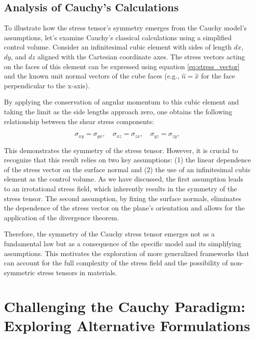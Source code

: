 \documentclass[12pt,a4paper,english]{article}
\begin{document}
\subsection{Analysis of Cauchy's Calculations}

To illustrate how the stress tensor's symmetry emerges from the Cauchy model's assumptions, let's examine Cauchy's classical calculations using a simplified control volume. Consider an infinitesimal cubic element with sides of length $dx$, $dy$, and $dz$ aligned with the Cartesian coordinate axes. The stress vectors acting on the faces of this element can be expressed using equation \ref{eq:stress_vector} and the known unit normal vectors of the cube faces (e.g., $\hat{n} = \hat{x}$ for the face perpendicular to the x-axis).

By applying the conservation of angular momentum to this cubic element and taking the limit as the side lengths approach zero, one obtains the following relationship between the shear stress components:

\begin{equation}
\sigma_{xy} = \sigma_{yx}, \quad \sigma_{xz} = \sigma_{zx}, \quad \sigma_{yz} = \sigma_{zy},
\end{equation}


This demonstrates the symmetry of the stress tensor. However, it is crucial to recognize that this result relies on two key assumptions: (1) the linear dependence of the stress vector on the surface normal and (2) the use of an infinitesimal cubic element as the control volume. As we have discussed, the first assumption leads to an irrotational stress field, which inherently results in the symmetry of the stress tensor. The second assumption, by fixing the surface normals, eliminates the dependence of the stress vector on the plane's orientation and allows for the application of the divergence theorem.

Therefore, the symmetry of the Cauchy stress tensor emerges not as a fundamental law but as a consequence of the specific model and its simplifying assumptions. This motivates the exploration of more generalized frameworks that can account for the full complexity of the stress field and the possibility of non-symmetric stress tensors in materials.


\section{Challenging the Cauchy Paradigm: Exploring Alternative Formulations}
\end{document}
